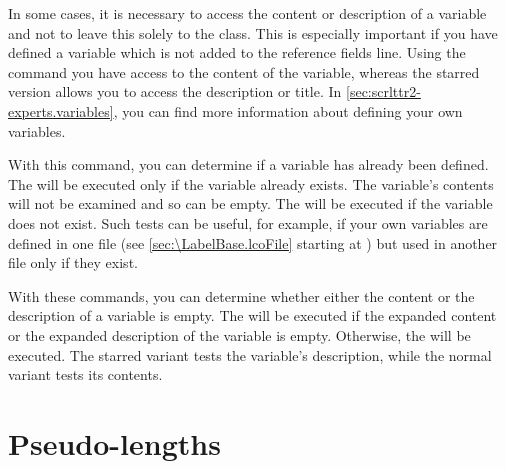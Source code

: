\begin{Declaration}
\end{Declaration}
In some cases, it is necessary to access
the content or description of a variable and not to leave this solely to the
class. This is especially important if you have defined a variable which is
not added to the reference fields line. Using the command 
you have access to the content of the  variable, whereas the
starred version  allows you to access the description or
title. In \autoref{sec:scrlttr2-experts.variables},
 you can find more information
about defining your own variables.%
\EndIndexGroup


\begin{Declaration}
\end{Declaration}
With this command, you can determine if a
variable has already been defined. The  will be executed only
if the variable already exists. The variable's contents will not be examined
and so can be empty. The  will be executed if the variable
does not exist. Such tests can be useful, for example, if your own variables
are defined in one  file (see
\autoref{sec:\LabelBase.lcoFile} starting at
) but used in another  file only
if they exist.%
\EndIndexGroup


\begin{Declaration}
\end{Declaration}
With these commands, you can determine
whether either the content or the description of a variable is empty. The
 will be executed if the expanded content or the expanded
description of the  variable is empty. Otherwise, the  will be executed. The starred variant tests the variable's description,
while the normal variant tests its contents.%
\EndIndexGroup
%
\EndIndexGroup


\section{Pseudo-lengths}
\BeginIndexGroup
{}

